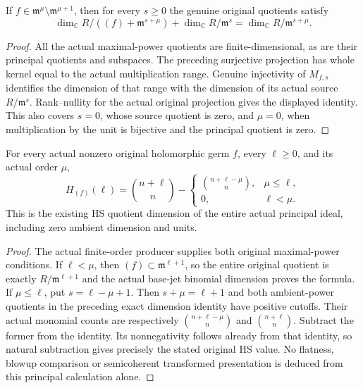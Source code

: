 \begin{theorem}
\label{hir:actual-principal-jet-exact-dimensions}
\leanok
{}
If $f\in\mathfrak m^\mu\setminus\mathfrak m^{\mu+1}$, then for every
$s\ge0$ the genuine original quotients satisfy
\[
 \dim_{\mathbb C}R/((f)+\mathfrak m^{s+\mu})
 +\dim_{\mathbb C}R/\mathfrak m^s
 =\dim_{\mathbb C}R/\mathfrak m^{s+\mu}.
\]
\end{theorem}
\begin{proof}
All the actual maximal-power quotients are finite-dimensional, as are their
principal quotients and subspaces. The preceding surjective projection
has whole kernel equal to the actual multiplication range. Genuine
injectivity of $M_{f,s}$ identifies the dimension of that range with the
dimension of its actual source $R/\mathfrak m^s$. Rank--nullity for the
actual original projection gives the displayed identity. This also covers
$s=0$, whose source quotient is zero, and $\mu=0$, when multiplication by
the unit is bijective and the principal quotient is zero.
\end{proof}

\begin{theorem}
\label{hir:actual-principal-entire-hilbert-samuel-formula}
\leanok
{}
For every actual nonzero original holomorphic germ $f$, every $\ell\ge0$,
and its actual order $\mu$,
\[
 H_{(f)}(\ell)=\binom{n+\ell}{n}
 -\begin{cases}\binom{n+\ell-\mu}{n},&\mu\le\ell,\\0,&\ell<\mu.\end{cases}
\]
This is the existing HS quotient dimension of the entire actual principal
ideal, including zero ambient dimension and units.
\end{theorem}
\begin{proof}
The actual finite-order producer supplies both original maximal-power
conditions. If $\ell<\mu$, then $(f)\subset\mathfrak m^{\ell+1}$, so
the entire original quotient is exactly $R/\mathfrak m^{\ell+1}$ and the
actual base-jet binomial dimension proves the formula. If $\mu\le\ell$,
put $s=\ell-\mu+1$. Then $s+\mu=\ell+1$ and both ambient-power
quotients in the preceding exact dimension identity have positive cutoffs.
Their actual monomial counts are respectively
$\binom{n+\ell-\mu}{n}$ and $\binom{n+\ell}{n}$. Subtract the former
from the identity. Its nonnegativity follows already from that identity,
so natural subtraction gives precisely the stated original HS value.
No flatness, blowup comparison or semicoherent transformed presentation is
deduced from this principal calculation alone.
\end{proof}
